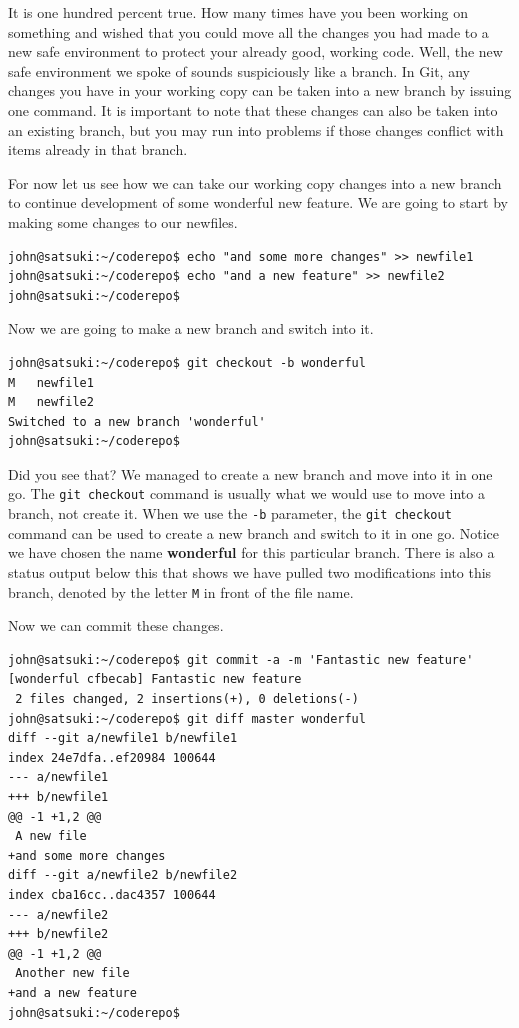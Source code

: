 It is one hundred percent true.
How many times have you been working on something and wished that you could move all the changes you had made to a new safe environment to protect your already good, working code.
Well, the new safe environment we spoke of sounds suspiciously like a branch.
In Git, any changes you have in your working copy can be taken into a new branch by issuing one command.
It is important to note that these changes can also be taken into an existing branch, but you may run into problems if those changes conflict with items already in that branch.

For now let us see how we can take our working copy changes into a new branch to continue development of some wonderful new feature.
We are going to start by making some changes to our newfiles.

\begin{Verbatim}
john@satsuki:~/coderepo$ echo "and some more changes" >> newfile1
john@satsuki:~/coderepo$ echo "and a new feature" >> newfile2
john@satsuki:~/coderepo$
\end{Verbatim}

Now we are going to make a new branch and switch into it.

\begin{Verbatim}
john@satsuki:~/coderepo$ git checkout -b wonderful
M	newfile1
M	newfile2
Switched to a new branch 'wonderful'
john@satsuki:~/coderepo$
\end{Verbatim}

Did you see that?  We managed to create a new branch and move into it in one go.
The \texttt{git checkout} command is usually what we would use to move into a branch, not create it.
When we use the \texttt{-b} parameter, the \texttt{git checkout} command can be used to create a new branch and switch to it in one go.
Notice we have chosen the name \textbf{wonderful} for this particular branch.
There is also a status output below this that shows we have pulled two modifications into this branch, denoted by the letter \texttt{M} in front of the file name.

Now we can commit these changes.

\begin{Verbatim}
john@satsuki:~/coderepo$ git commit -a -m 'Fantastic new feature'
[wonderful cfbecab] Fantastic new feature
 2 files changed, 2 insertions(+), 0 deletions(-)
john@satsuki:~/coderepo$ git diff master wonderful
diff --git a/newfile1 b/newfile1
index 24e7dfa..ef20984 100644
--- a/newfile1
+++ b/newfile1
@@ -1 +1,2 @@
 A new file
+and some more changes
diff --git a/newfile2 b/newfile2
index cba16cc..dac4357 100644
--- a/newfile2
+++ b/newfile2
@@ -1 +1,2 @@
 Another new file
+and a new feature
john@satsuki:~/coderepo$
\end{Verbatim}

